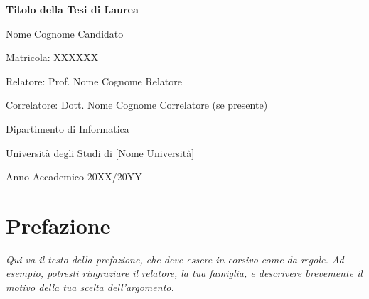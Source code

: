 \documentclass[12pt, a4paper]{book} %
\begin{document}
\begin{titlepage}
    \centering
    \vspace*{\fill}
    {\Huge\bfseries Titolo della Tesi di Laurea\par}
    \vspace{1cm}
    {\Large Nome Cognome Candidato\par}
    \vspace{0.5cm}
    {\large Matricola: XXXXXX\par}
    \vspace{1cm}
    {\Large Relatore: Prof. Nome Cognome Relatore\par}
    \vspace{0.5cm}
    {\large Correlatore: Dott. Nome Cognome Correlatore (se presente)\par}
    \vfill
    {\Large Dipartimento di Informatica\par}
    {\large Università degli Studi di [Nome Università]\par}
    {\large Anno Accademico 20XX/20YY\par}
    \vspace*{\fill}
\end{titlepage}

\chapter*{Prefazione} %
\textit{
    Qui va il testo della prefazione, che deve essere in corsivo come da regole.
    Ad esempio, potresti ringraziare il relatore, la tua famiglia, e descrivere brevemente il motivo della tua scelta dell'argomento.
}

\tableofcontents

\newpage %


%

%
%

\printbibliography[heading=bibintoc, title={Bibliografia}] %
\end{document}
